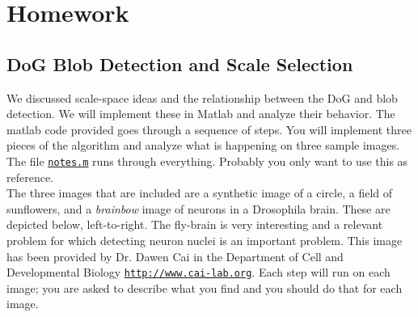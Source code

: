\section{Homework \thesection}

\subsection{DoG Blob Detection and Scale Selection}
We discussed scale-space ideas and the relationship between the DoG and blob detection.
We will implement these in Matlab and analyze their behavior.
The matlab code provided goes through a sequence of steps.
You will implement three pieces of the algorithm and analyze what is happening on three sample images.\\
The file \href{./hw3/problem1/notes.m}{\texttt{notes.m}} runs through everything.
Probably you only want to use this as reference.\\
The three images that are included are a synthetic image of a circle, a field of sunflowers, and a \emph{brainbow} image of neurons in
a Drosophila brain.
These are depicted below, left-to-right.
The fly-brain is very interesting and a relevant problem for which detecting neuron nuclei is an important problem.
This image has been provided by Dr. Dawen Cai in the Department of Cell and Developmental Biology \href{http://www.cai-lab.org}{\texttt{http://www.cai-lab.org}}.
Each step will run on each image; you are asked to describe what you find and you should do that for each image.
